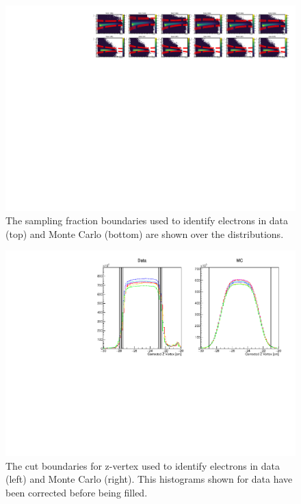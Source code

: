 \begin{figure}
  \centering
  \includegraphics[width=\textwidth]{image/plots/sidis/systematics/sampling_fraction.pdf}
  \caption[Systematic boundaries on sampling fraction]{The sampling fraction boundaries used to identify electrons in data (top) and Monte Carlo (bottom) are shown over the distributions.}
    \label{fig:systematics-sampling-fraction}

\end{figure}

\begin{figure}
  \centering
  \includegraphics[width=\textwidth]{image/plots/sidis/systematics/z_vertex.pdf}
  \caption[Systematic variations of electron z-vertex cuts.]{The cut boundaries for z-vertex used to identify electrons in data (left) and Monte Carlo (right).  This histograms shown for data have been corrected before being filled.}
    \label{fig:systematics-z-vertex}

\end{figure}

